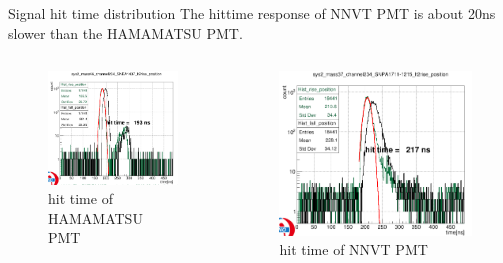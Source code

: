 \documentclass[11pt,compress,xcolor=x11names,UTF8]{beamer}
\begin{document}
\begin{frame}{Signal hit time distribution}
The hittime response of NNVT PMT is about 20ns slower than the HAMAMATSU PMT.
\begin{columns}
\begin{column}{.5\textwidth}
\begin{figure}
\centering
\includegraphics[width=\textwidth]{figures/riseposition.png} %
\caption{hit time of HAMAMATSU PMT}
\end{figure}
\end{column}
\begin{column}{.5\textwidth}
\begin{figure}
\centering
\includegraphics[width=\textwidth]{figures/hitpositionmcp.png} %
\caption{hit time of NNVT PMT}
\end{figure}
\end{column}
\end{columns}
\end{frame}
\end{document}
